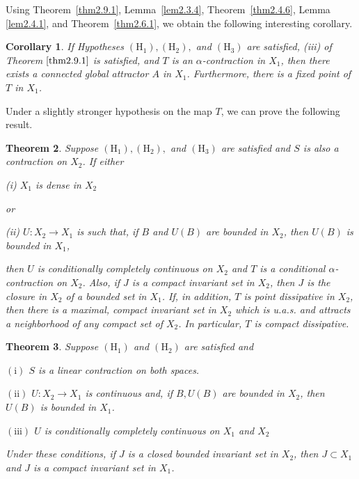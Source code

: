 \documentclass{surv-l}
\theoremstyle{plain}
\newtheorem{theorem}{Theorem}[section]
\newtheorem{corollary}[theorem]{Corollary}
\theoremstyle{definition}
\numberwithin{equation}{section}
\numberwithin{figure}{chapter}
\begin{document}
Using Theorem~\ref{thm2.9.1}, Lemma~\ref{lem2.3.4}, Theorem~\ref{thm2.4.6}, Lemma \ref{lem2.4.1}, and Theorem~\ref{thm2.6.1}, we obtain the following interesting corollary.

\begin{corollary}\label{cor2.9.2} If Hypotheses $(\mathrm{H}_{1}), (\mathrm{H}_{2}),$ and $(\mathrm{H}_{3})$ are satisfied, \emph{(iii)} of Theorem$~\ref{thm2.9.1}$ is satisfied, and $T$ is an $\alpha$-contraction in $X_{1}$, then there exists a connected global attractor $A$ in $X_{1}$. Furthermore, there is a fixed point of $T$ in $X_{1}$.
\end{corollary}

Under a slightly stronger hypothesis on the map $T$, we can prove the following result.

\begin{theorem}\label{thm2.9.3} Suppose $(\mathrm{H}_{1}), (\mathrm{H}_{2}),$ and $(\mathrm{H}_{3})$ are satisfied and $S$ is also a contraction on $X_{2}$. If either

\emph{(i)} $X_{1}$ is dense in $X_{2}$

or

\emph{(ii)} $U\!:X_{2}\rightarrow X_{1}$ is such that, if $B$ and $U(B)$ are bounded in $X_{2}$, then $U(B)$ is bounded in $X_{1}$,

then $U$ is conditionally completely continuous on $X_{2}$ and $T$ is a conditional $\alpha$-contraction on $X_{2}$. Also, if $J$ is a compact invariant set in $X_{2}$, then $J$ is the closure in $X_{2}$ of a bounded set in $X_{1}$. If, in addition, $T$ is point dissipative in $X_{2}$, then there is a maximal, compact invariant set in $X_{2}$ which is u.a.s. and attracts a neighborhood of any compact set of $X_{2}$. In particular, $T$ is compact dissipative.
\end{theorem}

\begin{theorem}\label{thm2.9.4} Suppose $(\mathrm{H}_{1})$ and $(\mathrm{H}_{2})$ are satisfied and

$\mathrm{(i)}$ $S$ is a linear contraction on both spaces.

$\mathrm{(ii)}$ $U\!:X_{2}\rightarrow X_{1}$ is continuous and, if $B, U(B)$ are bounded in $X_{2}$, then $U(B)$ is bounded in $X_{1}$.

$\mathrm{(iii)}$ $U$ is conditionally completely continuous on $X_{1}$ and $X_{2}$

Under these conditions, if $J$ is a closed bounded invariant set in $X_{2}$, then $J\subset X_{1}$ and $J$ is a compact invariant set in $X_{1}$.
\end{theorem}
\end{document}
